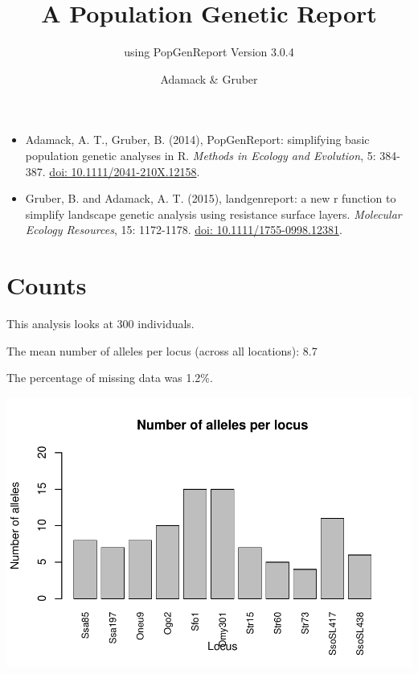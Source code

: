 \documentclass[a4paper]{scrartcl}\usepackage[]{graphicx}\usepackage[]{color}
\makeatletter
\def\maxwidth{ %
  \ifdim\Gin@nat@width>\linewidth
    \linewidth
  \else
    \Gin@nat@width
  \fi
}
\newenvironment{knitrout}{}{} %
\makeatother
\begin{document}
\title{A Population Genetic Report}


\subtitle {using PopGenReport Version  3.0.4 }

\author{Adamack \& Gruber}
\maketitle

\begin{itemize}
  \item Adamack, A. T., Gruber, B. (2014), PopGenReport: simplifying basic population genetic analyses in R. \emph{Methods in Ecology and Evolution}, 5: 384-387. \href{http://onlinelibrary.wiley.com/doi/10.1111/2041-210X.12158/full}{doi: 10.1111/2041-210X.12158}.
  \item Gruber, B. and Adamack, A. T. (2015), landgenreport: a new r function to simplify landscape genetic analysis using resistance surface layers. \emph{Molecular Ecology Resources}, 15: 1172-1178. \href{http://onlinelibrary.wiley.com/doi/10.1111/1755-0998.12381/full}{doi: 10.1111/1755-0998.12381}.
\end{itemize}


  

\tableofcontents
\newpage


\section{Counts}
This analysis looks at 300 individuals.

\noindent
\newline The mean number of alleles per locus (across all locations): 8.7


\noindent
\newline The percentage of missing data was 1.2\%.

\begin{knitrout}
\color{fgcolor}
\includegraphics[width=\maxwidth]{PopGenReport_Hatchery-n_alleles_per_locus-1} 

\end{knitrout}
\FloatBarrier
\end{document}
